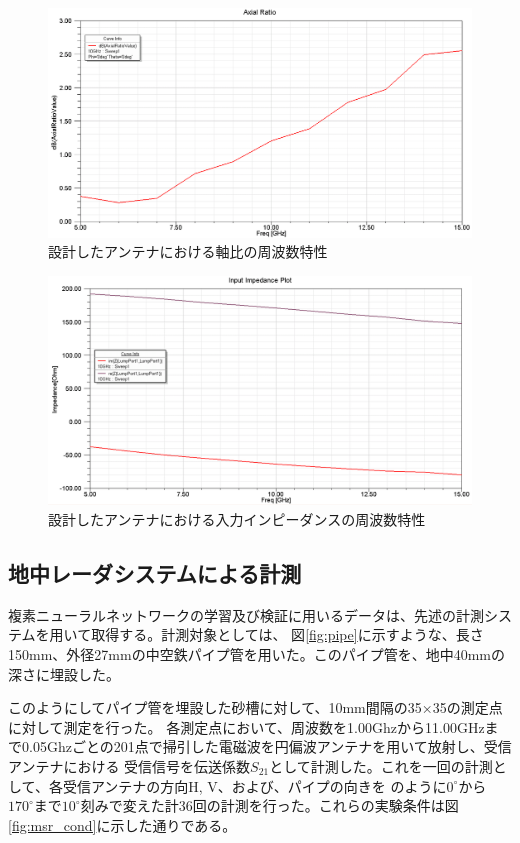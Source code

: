 \documentclass[11pt,a4paper,uplatex]{ujarticle}
\begin{document}
  \begin{figure}[hbtp]
    \centering
    \includegraphics[keepaspectratio, width=130mm]{Images/axial_ratio.png}
    \caption{設計したアンテナにおける軸比の周波数特性}
    \label{fig:axial_ratio}
  \end{figure}

  \begin{figure}[hbtp]
    \centering
    \includegraphics[keepaspectratio, width=130mm]{Images/spiral_impedance.png}
    \caption{設計したアンテナにおける入力インピーダンスの周波数特性}
    \label{fig:spiral_antenna_impedance}
  \end{figure}

\newpage

  \subsection{地中レーダシステムによる計測}
  複素ニューラルネットワークの学習及び検証に用いるデータは、先述の計測システムを用いて取得する。計測対象としては、
  図\ref{fig:pipe}に示すような、長さ150mm、外径27mmの中空鉄パイプ管を用いた。このパイプ管を、地中40mmの深さに埋設した。

  このようにしてパイプ管を埋設した砂槽に対して、10mm間隔の35×35の測定点に対して測定を行った。
  各測定点において、周波数を1.00Ghzから11.00GHzまで0.05Ghzごとの201点で掃引した電磁波を円偏波アンテナを用いて放射し、受信アンテナにおける
  受信信号を伝送係数$S_{21}$として計測した。これを一回の計測として、各受信アンテナの方向H, V、および、パイプの向きを
  のように$0^{\circ}$から$170^{\circ}$まで$10^{\circ}$刻みで変えた計36回の計測を行った。これらの実験条件は図\ref{fig:msr_cond}に示した通りである。
\end{document}

